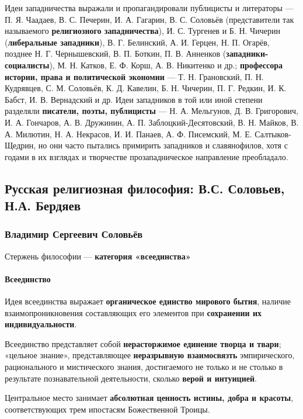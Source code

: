 \documentclass{article}
\begin{document}
\begin{flushleft}
Идеи западничества выражали и пропагандировали публицисты и литераторы — П. Я. Чаадаев, В. С. Печерин, И. А. Гагарин, В. С. Соловьёв (представители так называемого \textbf{религиозного западничества}), И. С. Тургенев и Б. Н. Чичерин (\textbf{либеральные западники}), В. Г. Белинский, А. И. Герцен, Н. П. Огарёв, позднее Н. Г. Чернышевский, В. П. Боткин, П. В. Анненков (\textbf{западники-социалисты}), М. Н. Катков, Е. Ф. Корш, А. В. Никитенко и др.; \textbf{профессора истории, права и политической экономии} — Т. Н. Грановский, П. Н. Кудрявцев, С. М. Соловьёв, К. Д. Кавелин, Б. Н. Чичерин, П. Г. Редкин, И. К. Бабст, И. В. Вернадский и др. Идеи западников в той или иной степени разделяли \textbf{писатели, поэты, публицисты} — Н. А. Мельгунов, Д. В. Григорович, И. А. Гончаров, А. В. Дружинин, А. П. Заблоцкий-Десятовский, В. Н. Майков, В. А. Милютин, Н. А. Некрасов, И. И. Панаев, А. Ф. Писемский, М. Е. Салтыков-Щедрин, но они часто пытались примирить западников и славянофилов, хотя с годами в их взглядах и творчестве прозападническое направление преобладало.

\subsection{Русская религиозная философия: В.С. Соловьев, Н.А. Бердяев}

 \subsubsection{Владимир Сергеевич Соловьёв}

Стержень философии — \textbf{категория «всеединства»}

\paragraph{Всеединство}

Идея всеединства выражает \textbf{органическое единство мирового бытия}, наличие взаимопроникновения составляющих его элементов при \textbf{сохранении их индивидуальности}.

Всеединство представляет собой \textbf{нерасторжимое единение творца и твари}; «цельное знание», представляющее \textbf{неразрывную взаимосвязть} эмпирического, рационального и мистического знания, достигаемого не только и не столько в результате познавательной деятельности, сколько \textbf{верой и интуицией}.

Центральное место занимает \textbf{абсолютная ценность истины, добра и красоты}, соответствующих трем ипостасям Божественной Троицы.


\end{flushleft}
\end{document}
